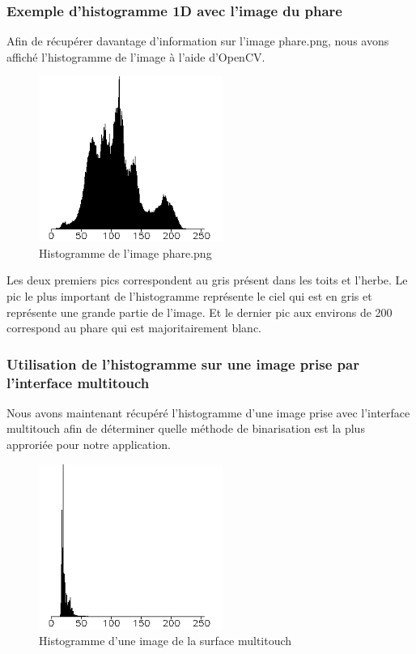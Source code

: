 \subsubsection{Exemple d'histogramme 1D avec l'image du phare}
Afin de récupérer davantage d'information sur l'image phare.png, nous avons affiché l'histogramme
de l'image à l'aide d'OpenCV.
\begin{figure}[H]
      \center
      \includegraphics[width=6cm]{ressources/tp4/histo.png}
      \caption{Histogramme de l'image phare.png}
\end{figure}

Les deux premiers pics correspondent au gris présent dans les toits et l'herbe.
Le pic le plus important de l'histogramme représente le ciel qui est en gris et représente une grande partie de l'image. 
Et le dernier pic aux environs de 200 correspond au phare qui est majoritairement blanc.

\subsubsection{Utilisation de l'histogramme sur une image prise par l'interface multitouch}

Nous avons maintenant récupéré l'histogramme d'une image prise avec l'interface multitouch afin 
de déterminer quelle méthode de binarisation est la plus approriée pour notre application.

\begin{figure}[H]
      \center
      \includegraphics[width=6cm]{ressources/tp4/histoDoigts.png}
      \caption{Histogramme d'une image de la surface multitouch}
\end{figure}

